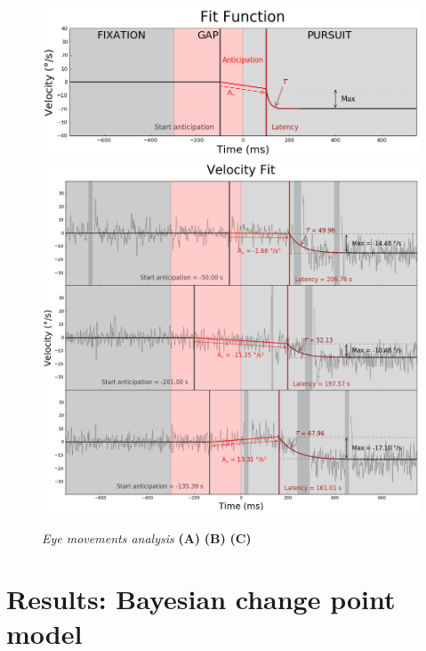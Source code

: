 \documentclass[profile,final,english, draft]{article}%
\begin{document}
\begin{figure}%
\begin{center} 
    \includegraphics[width=1\linewidth]{Fonction_Fit}
    \includegraphics[width=1\linewidth]{Fit_vitesse}
\end{center}
\caption{\emph{Eye movements analysis} \textbf{(A)} 
\textbf{(B)} 
\textbf{(C)}  }
\label{fig:eye_fits}
\end{figure}


\section{Results: Bayesian change point model}

\end{document}
